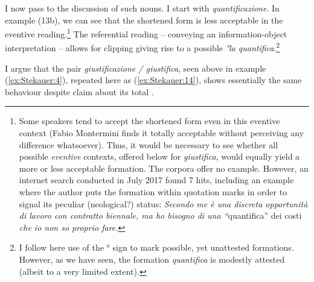 \documentclass[output=paper]{langsci/langscibook}
\begin{document}
I now pass to the discussion of such nouns. I start with
\emph{quantificazione}. In example (13b), we can see that the
shortened form is less acceptable in the eventive reading.\footnote{Some
  speakers tend to accept the shortened form even in this eventive
  context (Fabio Montermini finds it totally acceptable without
  perceiving any difference whatsoever). Thus, it would be necessary to
  see whether all possible \emph{eventive} contexts, offered below for
  \emph{giustifica}, would equally yield a more or less acceptable
  formation. The corpora  offer no example. However, an internet search conducted in July 2017 found 7 hits, including an example where the
  author puts the formation within quotation marks in order to signal
  its peculiar (neological?) status: \emph{Secondo me è una discreta
  opportunità di lavoro con contratto biennale, ma ho bisogno di una
  ``}quantifica'' dei costi \emph{che io non so proprio fare.}} The
referential reading -- conveying an information-object interpretation --
allows for clipping giving rise to a possible  \emph{°la
quantifica}.\footnote{I follow here  use of the ° sign to mark
  possible, yet unattested formations. However, as we have seen, the
  formation \emph{quantifica} is modestly attested (albeit to a very
  limited extent).}

\begin{exe}

\ex\label{ex:Stekauer:13}
\begin{xlist}


\end{xlist}
\end{exe}
I argue that the pair \emph{giustificazione / giustifica}, seen above in
example (\ref{ex:Stekauer:4}), repeated here as (\ref{ex:Stekauer:14}), shows essentially the same behaviour
despite %
%
claim about its total
.
\end{document}
